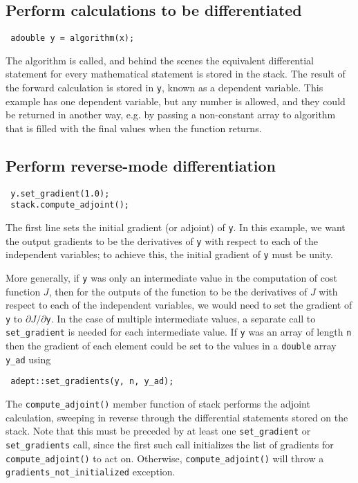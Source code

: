 \documentclass[a4,oneside]{book}
\def\codesize{\small}
\def\code#1{{\codesize\texttt{#1}}}
\begin{document}
\subsection{Perform calculations to be differentiated}
\begin{lstlisting}
 adouble y = algorithm(x);
\end{lstlisting}
The algorithm is called, and behind the scenes the equivalent
differential statement for every mathematical statement is stored in the
stack. The result of the forward calculation is stored in \code{y},
known as a dependent variable. This example has one dependent
variable, but any number is allowed, and they could be returned in
another way, e.g. by passing a non-constant array to algorithm that is
filled with the final values when the function returns.
%
\subsection{Perform reverse-mode differentiation}

\begin{lstlisting}
 y.set_gradient(1.0);
 stack.compute_adjoint();
\end{lstlisting}
The first line sets the initial gradient (or adjoint) of \code{y}. In
this example, we want the output gradients to be the derivatives of
\code{y} with respect to each of the independent variables; to achieve
this, the initial gradient of \code{y} must be unity.

More generally, if \code{y} was only an intermediate value in the
computation of cost function $J$, then for the outputs of the
function to be the derivatives of $J$ with respect to each of the
independent variables, we would need to set the gradient of
\code{y} to $\partial J/\partial$\code{y}. In the case of multiple
intermediate values, a separate call to \code{set\_gradient} is needed
for each intermediate value.  If \code{y} was an array of length
\code{n} then the gradient of each element could be set to the values in a \code{double} array \code{y\_ad} using
\begin{lstlisting}
 adept::set_gradients(y, n, y_ad);
\end{lstlisting}

The \code{compute\_adjoint()} member function of stack performs the
adjoint calculation, sweeping in reverse through the differential
statements stored on the stack. Note that this must be preceded by at
least one \code{set\_gradient} or \code{set\_gradients} call, since
the first such call initializes the list of gradients for
\code{compute\_adjoint()} to act on. Otherwise,
\code{compute\_adjoint()} will throw a
\code{gradients\_not\_initialized} exception. 
\end{document}
